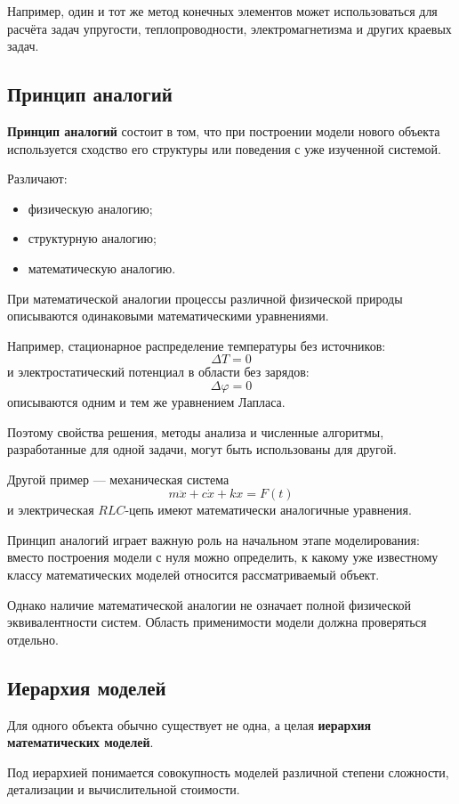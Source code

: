 Например, один и тот же метод конечных элементов может использоваться
для расчёта задач упругости, теплопроводности, электромагнетизма и других
краевых задач.


\subsection{Принцип аналогий}

\textbf{Принцип аналогий} состоит в том, что при построении модели нового объекта
используется сходство его структуры или поведения с уже изученной системой.

Различают:
\begin{itemize}
	\item физическую аналогию;
	\item структурную аналогию;
	\item математическую аналогию.
\end{itemize}

При математической аналогии процессы различной физической природы описываются
одинаковыми математическими уравнениями.

Например, стационарное распределение температуры без источников:
\[
\Delta T = 0
\]
и электростатический потенциал в области без зарядов:
\[
\Delta \varphi = 0
\]
описываются одним и тем же уравнением Лапласа.

Поэтому свойства решения, методы анализа и численные алгоритмы,
разработанные для одной задачи, могут быть использованы для другой.

Другой пример --- механическая система
\[
m\ddot{x}+c\dot{x}+kx=F(t)
\]
и электрическая $RLC$-цепь имеют математически аналогичные уравнения.

Принцип аналогий играет важную роль на начальном этапе моделирования:
вместо построения модели с нуля можно определить, к какому уже известному
классу математических моделей относится рассматриваемый объект.

Однако наличие математической аналогии не означает полной физической
эквивалентности систем. Область применимости модели должна проверяться
отдельно.


\subsection{Иерархия моделей}

Для одного объекта обычно существует не одна, а целая
\textbf{иерархия математических моделей}.

Под иерархией понимается совокупность моделей различной степени сложности,
детализации и вычислительной стоимости.

